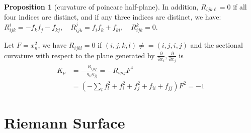 \documentclass[12pt,a4paper]{book}
\theoremstyle{definition}
\newtheorem{prop}[defn]{Proposition}
\begin{document}
\begin{prop}[curvature of poincare half-plane]
    In addition, $R_{i j k \ell}=0$ if all four indices are distinct,
    and if any three indices are distinct, we have:
    $R_{i j k}^i=-f_k f_j-f_{k j}, \quad R_{i j k}^j=f_i f_k+f_{k i}, \quad R_{i j k}^k=0$.

    Let $F=x_n^2$, we have $R_{ijkl}=0$ if $(i,j,k,l)\neq =(i,j,i,j)$ and
    the sectional curvature with respect to the plane generated by $\frac{\partial}{\partial x_i}, \frac{\partial}{\partial x_j}$ is
    $$
        \begin{aligned}
            K_{p} & =-\frac{R_{i j i j}}{g_{i i} g_{j j}}=-R_{i j i j} F^4          \\
                  & =\left(-\sum_l f_l^2+f_i^2+f_j^2+f_{i i}+f_{j j}\right) F^2 =-1
        \end{aligned}
    $$

\end{prop}




\chapter{Riemann Surface}
\end{document}
